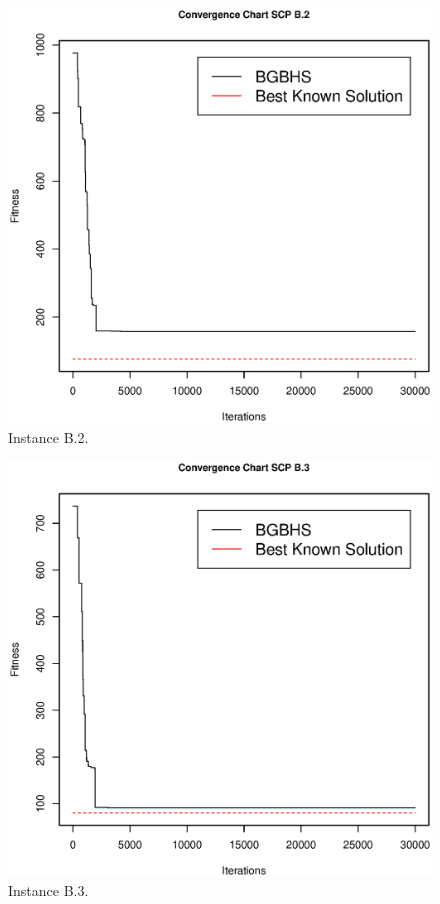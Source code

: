 \begin{figure}[]
\centering
\includegraphics[scale=.45]{Resultados/scpB2.eps}
\caption{Instance B.2.}
\label{fig:Instance.B.2}
\end{figure}

\clearpage

\begin{figure}[]
\centering
\includegraphics[scale=.45]{Resultados/scpB3.eps}
\caption{Instance B.3.}
\label{fig:Instance.B.3}
\end{figure}

